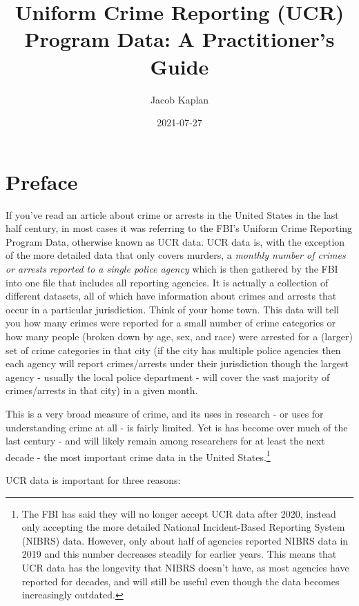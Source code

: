 \documentclass[
  12pt,
  openany]{book}
\title{Uniform Crime Reporting (UCR) Program Data: A Practitioner's Guide}
\author{Jacob Kaplan}
\date{2021-07-27}
\begin{document}
\maketitle

{
\hypersetup{linkcolor=}
\setcounter{tocdepth}{2}
\tableofcontents
}
\listoftables
\listoffigures
{}
\hypertarget{preface}{%
\chapter{Preface}\label{preface}}

If you've read an article about crime or arrests in the United States in the last half century, in most cases it was referring to the FBI's Uniform Crime Reporting Program Data, otherwise known as UCR data. UCR data is, with the exception of the more detailed data that only covers murders, a \emph{monthly number of crimes or arrests reported to a single police agency} which is then gathered by the FBI into one file that includes all reporting agencies. It is actually a collection of different datasets, all of which have information about crimes and arrests that occur in a particular jurisdiction. Think of your home town. This data will tell you how many crimes were reported for a small number of crime categories or how many people (broken down by age, sex, and race) were arrested for a (larger) set of crime categories in that city (if the city has multiple police agencies then each agency will report crimes/arrests under their jurisdiction though the largest agency - usually the local police department - will cover the vast majority of crimes/arrests in that city) in a given month.

This is a very broad measure of crime, and its uses in research - or uses for understanding crime at all - is fairly limited. Yet is has become over much of the last century - and will likely remain among researchers for at least the next decade - the most important crime data in the United States.\footnote{The FBI has said they will no longer accept UCR data after 2020, instead only accepting the more detailed National Incident-Based Reporting System (NIBRS) data. However, only about half of agencies reported NIBRS data in 2019 and this number decreases steadily for earlier years. This means that UCR data has the longevity that NIBRS doesn't have, as most agencies have reported for decades, and will still be useful even though the data becomes increasingly outdated.}

UCR data is important for three reasons:
\end{document}
